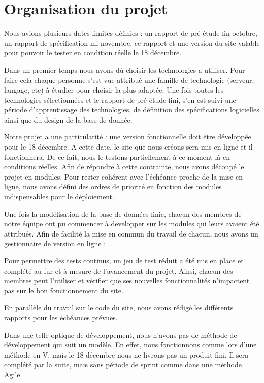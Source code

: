 \chapter{Organisation du projet}

Nous avions plusieurs dates limites définies : un rapport de pré-étude fin octobre, un rapport de spécification mi novembre, ce rapport et une version du site valable pour pouvoir le tester en condition réelle le 18 décembre.

Dans un premier temps nous avons dû choisir les technologies a utiliser. Pour faire cela chaque personne s'est vue attribué une famille de technologie (serveur, langage, etc) à étudier pour choisir la plus adaptée.
Une fois toutes les technologies sélectionnées et le rapport de pré-étude fini, s'en est suivi une période d'apprentissage des technologies, de définition des spécifications logicielles ainsi que du design de la base de donnée.

Notre projet a une particularité : une version fonctionnelle doit être développée pour le 18 décembre. A cette date, le site que nous créons sera mis en ligne et il fonctionnera. De ce fait, nous le testons partiellement à ce moment là en conditions réelles. Afin de répondre à cette contrainte, nous avons découpé le projet en modules. Pour rester cohérent avec l'échéance proche de la mise en ligne, nous avons défini des ordres de priorité en fonction des modules indispensables pour le déploiement.

Une fois la modélisation de la base de données finie, chacun des membres de notre équipe ont pu commencer à developper sur les modules qui leurs avaient été attribués. Afin de facilité la mise en commun du travail de chacun, nous avons un gestionnaire de version en ligne : \git.

Pour permettre des tests continus, un jeu de test réduit a été mis en place et complété au fur et à mesure de l'avancement du projet. Ainsi, chacun des membres peut l'utiliser et vérifier que ses nouvelles fonctionnalités n'impactent pas sur le bon fonctionnement du site.

En parallèle du travail sur le code du site, nous avons rédigé les différents rapports pour les échéances prévues.

Dans une telle optique de développement, nous n'avons pas de méthode de développement qui suit un modèle. En effet, nous fonctionnons comme lors d'une méthode en V, mais le 18 décembre nous ne livrons pas un produit fini. Il sera complété par la suite, mais sans période de sprint comme dans une méthode Agile.